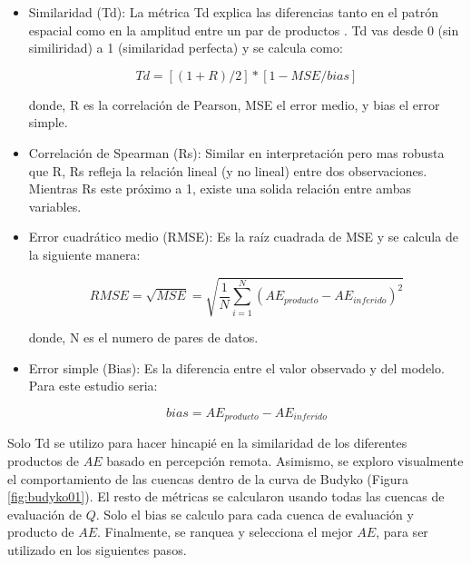 \documentclass[12pt]{article}
\begin{document}
\begin{itemize}

	\item Similaridad (Td): La métrica Td explica las diferencias tanto en el patrón espacial como en la amplitud entre un par de productos \citep{Tian2017}. Td vas desde 0 (sin similiridad) a 1 (similaridad perfecta) y se calcula como:
	
	\begin{equation}
    Td = [(1 + R) / 2]*[1 - MSE/bias]
    \end{equation}
    
    donde, R es la correlación de Pearson, MSE el error medio, y bias el error simple.
    
	\item Correlación de Spearman (Rs): Similar en interpretación pero mas robusta que R, Rs refleja la relación lineal (y no lineal) entre dos observaciones. Mientras Rs este próximo a 1, existe una solida relación entre ambas variables.
	
	\item Error cuadrático medio (RMSE): Es la raíz cuadrada de MSE y se calcula de la siguiente manera:
	
    \begin{equation}
        RMSE = \sqrt{MSE} = \sqrt{\frac{1}{N} \sum_{i=1}^{N}(AE_{producto}-AE_{inferido})^{2}}
    \end{equation}
    
    donde, N es el numero de pares de datos.
    
	\item Error simple (Bias): Es la diferencia entre el valor observado y del modelo. Para este estudio seria:
	
    \begin{equation}
        bias = AE_{producto}-AE_{inferido}
    \end{equation}
	
\end{itemize}

Solo Td se utilizo para hacer hincapié en la similaridad de los diferentes productos de $AE$ basado en percepción remota. Asimismo, se exploro visualmente el comportamiento de las cuencas dentro de la curva de Budyko (Figura \ref{fig:budyko01}). El resto de métricas se calcularon usando todas las cuencas de evaluación de $Q$. Solo el bias se calculo para cada cuenca de evaluación y producto de $AE$. Finalmente, se ranquea y selecciona el mejor $AE$, para ser utilizado en los siguientes pasos.
\end{document}

